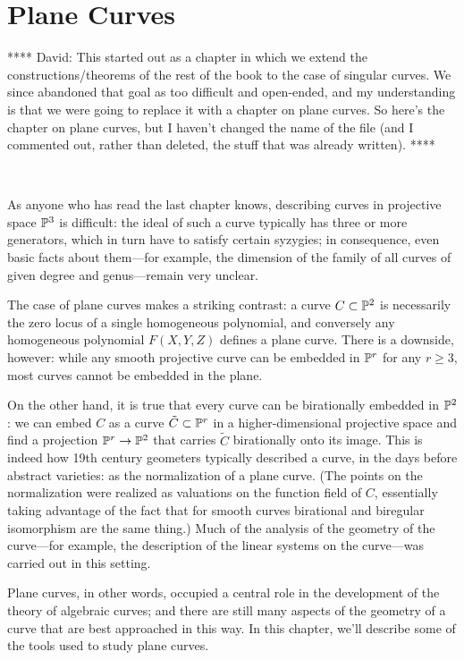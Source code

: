 

\chapter{Plane Curves}
\label{PlaneCurvesChapter}

**** David: This started out as a chapter in which we extend the constructions/theorems of the rest of the book to the case of singular curves. We since abandoned that goal as too difficult and open-ended, and my understanding is that we were going to replace it with a chapter on plane curves. So here's the chapter on plane curves, but I haven't changed the name of the file (and I commented out, rather than deleted, the stuff that was already written). ****

\

As anyone who has read the last chapter knows, describing curves in projective space ${\mathbb P}^3$  is difficult: the ideal of such a curve typically has three or more generators, which in turn have to satisfy certain syzygies; in consequence, even basic facts about them---for example, the dimension of the family of all curves of given degree and genus---remain very unclear.

The case of plane curves makes a striking contrast: a curve $C \subset {\mathbb P}^2$ is necessarily the zero locus of a single homogeneous polynomial, and conversely any homogeneous polynomial $F(X,Y,Z)$ defines a plane curve. There is a downside, however: while any smooth projective curve can be embedded in ${\mathbb P}^r$ for any $r \geq 3$, most curves cannot be embedded in the plane. 

On the other hand, it is true that every curve can be birationally embedded in ${\mathbb P}^2$: we can embed $C$ as a curve $\tilde C \subset {\mathbb P}^r$ in a higher-dimensional projective space and find a projection ${\mathbb P}^r \to {\mathbb P}^2$ that carries $\tilde C$ birationally onto its image. This is indeed how 19th century geometers typically described a curve, in the days before abstract varieties: as the normalization of a plane curve. (The points on the normalization were realized as valuations on the function field of $C$, essentially taking advantage of the fact that for smooth curves birational and biregular isomorphism are the same thing.) Much of the analysis of the geometry of the curve---for example, the description of the linear systems on the curve---was carried out in this setting.

Plane curves, in other words, occupied a central role in the development of the theory of algebraic curves; and there are still many aspects of the geometry of a curve that are best approached in this way. In this chapter, we'll describe some of the tools used to study plane curves.

